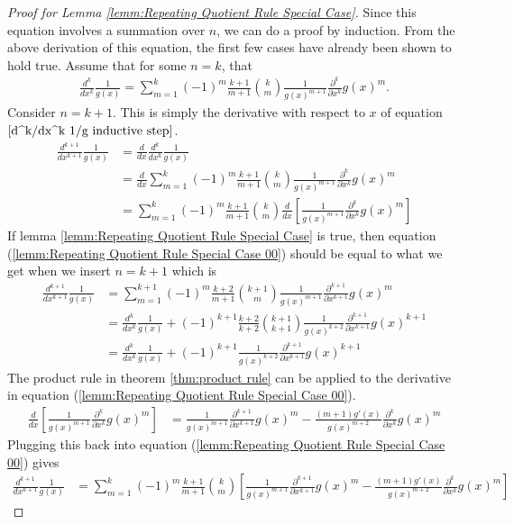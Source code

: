 \begin{proof}[Proof for Lemma \ref{lemm:Repeating Quotient Rule Special Case}]
	Since this equation involves a summation over $n$, we can do a proof by induction. From the above derivation of this equation, the first few cases have already been shown to hold true. Assume that for some $n=k$, that 
	\begin{align}
	\frac{d^k}{dx^k}\frac{1}{g(x)} = \sum_{m=1}^{k}(-1)^m\frac{k+1}{m+1}\binom{k}{m}\frac{1}{g(x)^{m+1}}\frac{\partial^k}{\partial x^k}g(x)^m \label{d^k/dx^k 1/g inductive step}.
	\end{align} 
	Consider $n=k+1$. This is simply the derivative with respect to $x$ of equation $\ref{d^k/dx^k 1/g inductive step}$.
	\begin{align}
	\frac{d^{k+1}}{dx^{k+1}}\frac{1}{g(x)} &= \frac{d}{dx}\frac{d^k}{dx^k}\frac{1}{g(x)} \\
	&= \frac{d}{dx}\sum_{m=1}^{k}(-1)^m\frac{k+1}{m+1}\binom{k}{m}\frac{1}{g(x)^{m+1}}\frac{\partial^k}{\partial x^k}g(x)^m \\
	&= \sum_{m=1}^{k}(-1)^m\frac{k+1}{m+1}\binom{k}{m}\frac{d}{dx}\left[\frac{1}{g(x)^{m+1}}\frac{\partial^k}{\partial x^k}g(x)^m\right] \label{lemm:Repeating Quotient Rule Special Case 00}
	\end{align}
	If lemma \ref{lemm:Repeating Quotient Rule Special Case} is true, then equation (\ref{lemm:Repeating Quotient Rule Special Case 00}) should be equal to what we get when we insert $n=k+1$ which is
	\begin{align}
		\frac{d^{k+1}}{dx^{k+1}}\frac{1}{g(x)} &= \sum_{m=1}^{k+1}(-1)^m\frac{k+2}{m+1}\binom{k+1}{m}\frac{1}{g(x)^{m+1}}\frac{\partial^{k+1}}{\partial x^{k+1}}g(x)^m \\
		&= \frac{d^k}{dx^k}\frac{1}{g(x)} + (-1)^{k+1}\frac{k+2}{k+2}\binom{k+1}{k+1}\frac{1}{g(x)^{k+2}}\frac{\partial^{k+1}}{\partial x^{k+1}}g(x)^{k+1} \\
		&= \frac{d^k}{dx^k}\frac{1}{g(x)} + (-1)^{k+1}\frac{1}{g(x)^{k+2}}\frac{\partial^{k+1}}{\partial x^{k+1}}g(x)^{k+1} \label{lemm:Repeating Quotient Rule Special Case 01}
	\end{align}	
	The product rule in theorem \ref{thm:product rule} can be applied to the derivative in equation (\ref{lemm:Repeating Quotient Rule Special Case 00}). 
	\begin{align}
	\frac{d}{dx}\left[\frac{1}{g(x)^{m+1}}\frac{\partial^k}{\partial x^k}g(x)^m\right] &= \frac{1}{g(x)^{m+1}}\frac{\partial^{k+1}}{\partial x^{k+1}}g(x)^m - \frac{(m+1)g'(x)}{g(x)^{m+2}}\frac{\partial^k}{\partial x^k}g(x)^m  \label{lemm:Repeating Quotient Rule Special Case 02}
	\end{align}
	Plugging this back into equation (\ref{lemm:Repeating Quotient Rule Special Case 00}) gives
		\begin{align}
		\frac{d^{k+1}}{dx^{k+1}}\frac{1}{g(x)} &= \sum_{m=1}^{k}(-1)^m\frac{k+1}{m+1}\binom{k}{m}\left[\frac{1}{g(x)^{m+1}}\frac{\partial^{k+1}}{\partial x^{k+1}}g(x)^m - \frac{(m+1)g'(x)}{g(x)^{m+2}}\frac{\partial^k}{\partial x^k}g(x)^m\right] \label{lemm:Repeating Quotient Rule Special Case 03}
	\end{align}	
	

\end{proof}
